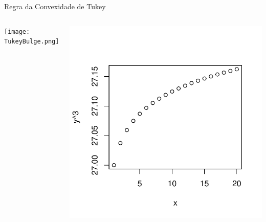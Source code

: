 \documentclass{beamer}\usepackage[]{graphicx}\usepackage[]{color}
\newenvironment{knitrout}{}{} %
\renewenvironment{knitrout}{\setlength{\topsep}{0mm}}{}
\begin{document}
\begin{frame}{Regra da Convexidade de Tukey}

\begin{columns}[c]

\centering
\texttt{[image: TukeyBulge.png]}

\centering
\begin{knitrout}
\color{fgcolor}
\includegraphics[width=0.7\linewidth]{figure/rem20-1} 

\end{knitrout}

\end{columns}

\end{frame}
\end{document}
